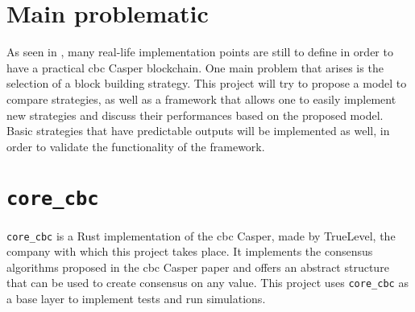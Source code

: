 \begin{table}[H]
\end{table}

\section{Main problematic}
As seen in , many real-life implementation points are still
to define in order to have a practical \gls{cbc} Casper blockchain. One main
problem that arises is the selection of a block building strategy. This project
will try to propose a model to compare strategies, as well as a framework that
allows one to easily implement new strategies and discuss their performances
based on the proposed model.  Basic strategies that have predictable outputs
will be implemented as well, in order to validate the functionality of the
framework.

\section{\texttt{core\_cbc}}
\texttt{core\_cbc} is a Rust implementation of the \gls{cbc} Casper, made by
TrueLevel, the company with which this project takes place. It implements the
consensus algorithms proposed in the \gls{cbc} Casper paper and offers an
abstract structure that can be used to create consensus on any value. This
project uses \texttt{core\_cbc} as a base layer to implement tests and run
simulations.

